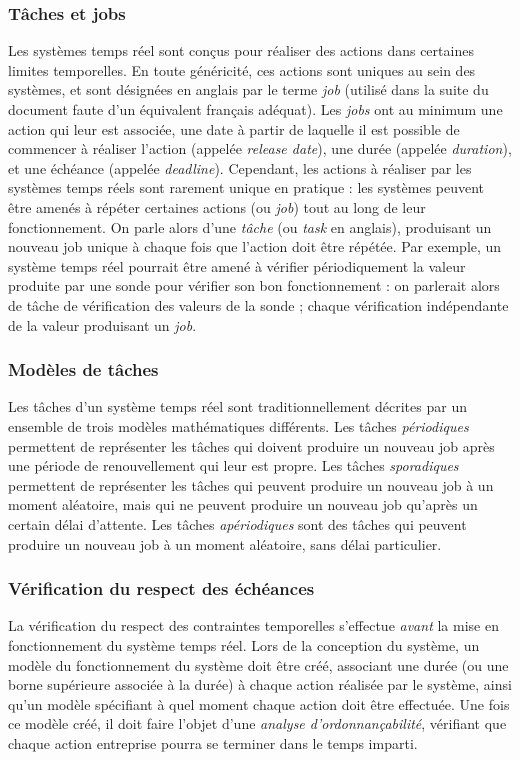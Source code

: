 		\subsubsection{Tâches et jobs}
		Les systèmes temps réel sont conçus pour réaliser des actions dans certaines limites temporelles. En toute généricité, ces actions sont uniques au sein des systèmes, et sont désignées en anglais par le terme \emph{job} (utilisé dans la suite du document faute d'un équivalent français adéquat). Les \emph{jobs} ont au minimum une action qui leur est associée, une date à partir de laquelle il est possible de commencer à réaliser l'action (appelée \emph{release date}), une durée (appelée \emph{duration}), et une échéance (appelée \emph{deadline}).
		Cependant, les actions à réaliser par les systèmes temps réels sont rarement unique en pratique : les systèmes peuvent être amenés à répéter certaines actions (ou \emph{job}) tout au long de leur fonctionnement. On parle alors d'une \emph{tâche} (ou \emph{task} en anglais), produisant un nouveau job unique à chaque fois que l'action doit être répétée. Par exemple, un système temps réel pourrait être amené à vérifier périodiquement la valeur produite par une sonde pour vérifier son bon fonctionnement : on parlerait alors de tâche de vérification des valeurs de la sonde ; chaque vérification indépendante de la valeur produisant un \emph{job}.

		\subsubsection{Modèles de tâches}
		Les tâches d'un système temps réel sont traditionnellement décrites par un ensemble de trois modèles mathématiques différents. Les tâches \emph{périodiques} permettent de représenter les tâches qui doivent produire un nouveau job après une période de renouvellement qui leur est propre. Les tâches \emph{sporadiques} permettent de représenter les tâches qui peuvent produire un nouveau job à un moment aléatoire, mais qui ne peuvent produire un nouveau job qu'après un certain délai d'attente. Les tâches \emph{apériodiques} sont des tâches qui peuvent produire un nouveau job à un moment aléatoire, sans délai particulier.

		\subsubsection{Vérification du respect des échéances}
		La vérification du respect des contraintes temporelles s'effectue \emph{avant} la mise en fonctionnement du système temps réel. Lors de la conception du système, un modèle du fonctionnement du système doit être créé, associant une durée (ou une borne supérieure associée à la durée) à chaque action réalisée par le système, ainsi qu'un modèle spécifiant à quel moment chaque action doit être effectuée. Une fois ce modèle créé, il doit faire l'objet d'une \emph{analyse d'ordonnançabilité}, vérifiant que chaque action entreprise pourra se terminer dans le temps imparti.


